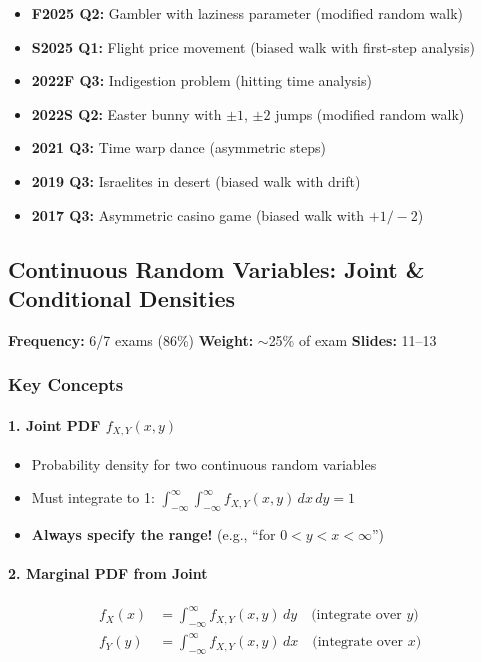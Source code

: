 \documentclass[11pt,letterpaper]{article}
\begin{document}
\begin{itemize}[leftmargin=*]
  \item \textbf{F2025 Q2:} Gambler with laziness parameter (modified random walk)
  \item \textbf{S2025 Q1:} Flight price movement (biased walk with first-step analysis)
  \item \textbf{2022F Q3:} Indigestion problem (hitting time analysis)
  \item \textbf{2022S Q2:} Easter bunny with $\pm 1$, $\pm 2$ jumps (modified random walk)
  \item \textbf{2021 Q3:} Time warp dance (asymmetric steps)
  \item \textbf{2019 Q3:} Israelites in desert (biased walk with drift)
  \item \textbf{2017 Q3:} Asymmetric casino game (biased walk with $+1/-2$)
\end{itemize}

\newpage

\subsection{Continuous Random Variables: Joint \& Conditional Densities}

\textbf{Frequency:} 6/7 exams (86\%) \quad \textbf{Weight:} $\sim$25\% of exam \quad \textbf{Slides:} 11--13

\subsubsection{Key Concepts}

\paragraph{1. Joint PDF $f_{X,Y}(x,y)$}
\begin{itemize}
  \item Probability density for two continuous random variables
  \item Must integrate to 1: $\int_{-\infty}^{\infty} \int_{-\infty}^{\infty} f_{X,Y}(x,y) \, dx \, dy = 1$
  \item \textbf{Always specify the range!} (e.g., ``for $0 < y < x < \infty$'')
\end{itemize}

\paragraph{2. Marginal PDF from Joint}
\begin{align*}
f_X(x) &= \int_{-\infty}^{\infty} f_{X,Y}(x,y) \, dy \quad \text{(integrate over } y\text{)} \\
f_Y(y) &= \int_{-\infty}^{\infty} f_{X,Y}(x,y) \, dx \quad \text{(integrate over } x\text{)}
\end{align*}
\end{document}
